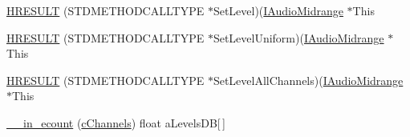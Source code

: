 \begin{DoxyCompactItemize}
\item 
\hyperlink{struct_i_audio_midrange_vtbl_af69bf31996d8203249e3d29b93501392}{H\+R\+E\+S\+U\+LT} (S\+T\+D\+M\+E\+T\+H\+O\+D\+C\+A\+L\+L\+T\+Y\+PE $\ast$Set\+Level)(\hyperlink{devicetopology_8h_a4da06c3982b0dfbafb61813769a9ccc7}{I\+Audio\+Midrange} $\ast$This
\item 
\hyperlink{struct_i_audio_midrange_vtbl_af883c71489969baaff5006a41375d785}{H\+R\+E\+S\+U\+LT} (S\+T\+D\+M\+E\+T\+H\+O\+D\+C\+A\+L\+L\+T\+Y\+PE $\ast$Set\+Level\+Uniform)(\hyperlink{devicetopology_8h_a4da06c3982b0dfbafb61813769a9ccc7}{I\+Audio\+Midrange} $\ast$This
\item 
\hyperlink{struct_i_audio_midrange_vtbl_ad0593f3ca08f7a0d98f3b93fc84c5067}{H\+R\+E\+S\+U\+LT} (S\+T\+D\+M\+E\+T\+H\+O\+D\+C\+A\+L\+L\+T\+Y\+PE $\ast$Set\+Level\+All\+Channels)(\hyperlink{devicetopology_8h_a4da06c3982b0dfbafb61813769a9ccc7}{I\+Audio\+Midrange} $\ast$This
\item 
\hyperlink{struct_i_audio_midrange_vtbl_a9915442c9325e75441d3fceb4acba2c0}{\+\_\+\+\_\+in\+\_\+ecount} (\hyperlink{struct_i_audio_midrange_vtbl_a581ad81f4b0a1af5b95b02100a092690}{c\+Channels}) float a\+Levels\+DB\mbox{[}$\,$\mbox{]}
\end{DoxyCompactItemize}
